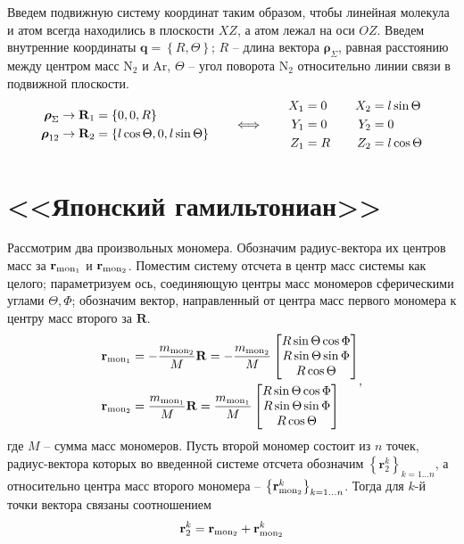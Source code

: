 \documentclass[14pt]{extarticle}
\newcommand{\mf}{\mathbf}
\newcommand{\vr}{\mathbf{r}}
\newcommand{\vrho}{\boldsymbol{\rho}}
\newcommand{\vR}{\mathbf{R}}
\newcommand{\mmf}{m_{\textup{mon}_1}}
\newcommand{\mms}{m_{\textup{mon}_2}}
\newcommand{\vrmf}{\mathbf{r}_{\textup{mon}_1}}
\newcommand{\vrms}{\mathbf{r}_{\textup{mon}_2}}
\begin{document}
Введем подвижную систему координат таким образом, чтобы линейная молекула и атом всегда находились в плоскости $XZ$, а атом лежал на оси $OZ$. Введем внутренние координаты $\mf{q} = \left\{ R, \Theta \right\}$; $R$ -- длина вектора $\vrho_\Sigma$, равная расстоянию между центром масс N$_2$ и Ar, $\Theta$ -- угол поворота N$_2$ относительно линии связи в подвижной плоскости.  
\begin{gather}
	\begin{aligned}
		\vrho_\Sigma &\rightarrow \mf{R}_1 = \left\{ 0, 0, R \right\} \\ 
		\vrho_{12} &\rightarrow \mf{R}_2 = \left\{ l \cos \Theta, 0, l \sin \Theta \right\}
	\end{aligned} \quad \quad \Longleftrightarrow \quad \quad  
	\begin{aligned}
		X_1 &= 0 \\
		Y_1 &= 0 \\
		Z_1 &= R
	\end{aligned}
	\quad \quad 
	\begin{aligned}
		X_2 &= l \sin \Theta \\
		Y_2 &= 0 \\
		Z_2 &= l \cos \Theta
	\end{aligned} \notag
\end{gather}

\newpage
\section*{<<Японский гамильтониан>>}

Рассмотрим два произвольных мономера. Обозначим радиус-вектора их центров масс за $\vrmf$ и $\vrms$. Поместим систему отсчета в центр масс системы как целого; параметризуем ось, соединяющую центры масс мономеров сферическими углами $\Theta, \Phi$; обозначим вектор, направленный от центра масс первого мономера к центру масс второго за $\vR$. 
\begin{gather}
	\begin{aligned}
		\vrmf &= - \frac{\mms}{M} \vR = -\frac{\mms}{M} \begin{bmatrix} R \sin \Theta \cos  \Phi \\ R \sin \Theta \sin \Phi \\ R \cos \Theta \end{bmatrix} \\
		\vrms &= \frac{\mmf}{M} \vR = \frac{\mmf}{M} \begin{bmatrix} R \sin \Theta \cos \Phi \\ R \sin \Theta \sin \Phi \\ R \cos \Theta \end{bmatrix}
	\end{aligned},  \label{com_mon}
\end{gather}
где $M$ -- сумма масс мономеров. Пусть второй мономер состоит из $n$ точек, радиус-вектора которых во введенной системе отсчета обозначим $\left\{ \vr_2^k \right\}_{k = 1 \dots n}$, а относительно центра масс второго мономера -- $\left\{ \vrms^k \right\}_{k = 1 \dots n}$. Тогда для $k$-й точки вектора связаны соотношением
\begin{gather}
	\vr_2^k = \vrms + \vrms^k 
\end{gather}
\end{document}
